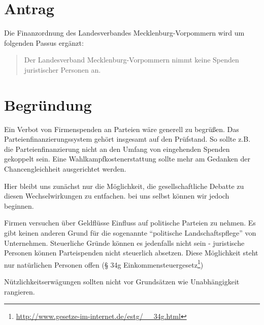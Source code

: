 \section{Antrag}

Die Finanzordnung des Landesverbandes Mecklenburg-Vorpommern wird um folgenden Passus ergänzt:

\begin{quote}
Der Landesverband Mecklenburg-Vorpommern nimmt keine Spenden juristischer Personen an.

\end{quote}
\section{Begründung}

Ein Verbot von Firmenspenden an Parteien wäre generell zu begrüßen. Das Parteienfinanzierungssystem gehört insgesamt auf den Prüfstand. So sollte z.B. die Parteienfinanzierung nicht an den Umfang von eingehenden Spenden gekoppelt sein. Eine Wahlkampfkostenerstattung sollte mehr am Gedanken der Chancengleichheit ausgerichtet werden.

Hier bleibt uns zunächst nur die Möglichkeit, die gesellschaftliche Debatte zu diesen Wechselwirkungen zu entfachen. bei uns selbst können wir jedoch beginnen.

Firmen versuchen über Geldflüsse Einfluss auf politische Parteien zu nehmen. Es gibt keinen anderen Grund für die sogenannte ``politische Landschaftspflege'' von Unternehmen. Steuerliche Gründe können es jedenfalls nicht sein - juristische Personen können Parteispenden nicht steuerlich absetzen. Diese Möglichkeit steht nur natürlichen Personen offen (§ 34g Einkommensteuergesetz\footnote{\url{http://www.gesetze-im-internet.de/estg/\_\_34g.html}})

Nützlichkeitserwägungen sollten nicht vor Grundsätzen wie Unabhängigkeit rangieren.
